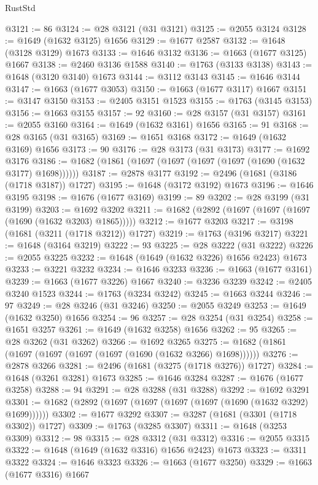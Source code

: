 \begin{lexlean}{RustStd}
\begin{coremodule}
{\begin{coremodule}
{{{{{{{{{{{{{{{{{{{{{{{{{{{{{{{{{{{{{{{{{{{{@3121 := 86
@3124 := @28 @3121 (@31 @3121)
@3125 := @2055 @3124
@3128 := @1649 (@1632 @3125) @1656
@3129 := @1677 @2587
@3132 := @1648 (@3128 @3129) @1673
@3133 := @1646 @3132
@3136 := @1663 (@1677 @3125) @1667
@3138 := @2460 @3136 @1588
@3140 := @1763 (@3133 @3138)
@3143 := @1648 (@3120 @3140) @1673
@3144 := @3112 @3143
@3145 := @1646 @3144
@3147 := @1663 (@1677 @3053)
@3150 := @1663 (@1677 @3117) @1667
@3151 := @3147 @3150
@3153 := @2405 @3151 @1523
@3155 := @1763 (@3145 @3153)
@3156 := @1663 @3155
@3157 := 92
@3160 := @28 @3157 (@31 @3157)
@3161 := @2055 @3160
@3164 := @1649 (@1632 @3161) @1656
@3165 := 91
@3168 := @28 @3165 (@31 @3165)
@3169 := @1651 @3168
@3172 := @1649 (@1632 @3169) @1656
@3173 := 90
@3176 := @28 @3173 (@31 @3173)
@3177 := @1692 @3176
@3186 := @1682 (@1861 (@1697 (@1697 (@1697 (@1697 (@1690 (@1632 @3177) @1698))))))
@3187 := @2878 @3177
@3192 := @2496 (@1681 (@3186 (@1718 @3187)) @1727)
@3195 := @1648 (@3172 @3192) @1673
@3196 := @1646 @3195
@3198 := @1676 (@1677 @3169)
@3199 := 89
@3202 := @28 @3199 (@31 @3199)
@3203 := @1692 @3202
@3211 := @1682 (@2892 (@1697 (@1697 (@1697 (@1690 (@1632 @3203) @1865)))))
@3212 := @1677 @3203
@3217 := @3198 (@1681 (@3211 (@1718 @3212)) @1727)
@3219 := @1763 (@3196 @3217)
@3221 := @1648 (@3164 @3219)
@3222 := 93
@3225 := @28 @3222 (@31 @3222)
@3226 := @2055 @3225
@3232 := @1648 (@1649 (@1632 @3226) @1656 @2423) @1673
@3233 := @3221 @3232
@3234 := @1646 @3233
@3236 := @1663 (@1677 @3161)
@3239 := @1663 (@1677 @3226) @1667
@3240 := @3236 @3239
@3242 := @2405 @3240 @1523
@3244 := @1763 (@3234 @3242)
@3245 := @1663 @3244
@3246 := 97
@3249 := @28 @3246 (@31 @3246)
@3250 := @2055 @3249
@3253 := @1649 (@1632 @3250) @1656
@3254 := 96
@3257 := @28 @3254 (@31 @3254)
@3258 := @1651 @3257
@3261 := @1649 (@1632 @3258) @1656
@3262 := 95
@3265 := @28 @3262 (@31 @3262)
@3266 := @1692 @3265
@3275 := @1682 (@1861 (@1697 (@1697 (@1697 (@1697 (@1690 (@1632 @3266) @1698))))))
@3276 := @2878 @3266
@3281 := @2496 (@1681 (@3275 (@1718 @3276)) @1727)
@3284 := @1648 (@3261 @3281) @1673
@3285 := @1646 @3284
@3287 := @1676 (@1677 @3258)
@3288 := 94
@3291 := @28 @3288 (@31 @3288)
@3292 := @1692 @3291
@3301 := @1682 (@2892 (@1697 (@1697 (@1697 (@1697 (@1690 (@1632 @3292) @1699))))))
@3302 := @1677 @3292
@3307 := @3287 (@1681 (@3301 (@1718 @3302)) @1727)
@3309 := @1763 (@3285 @3307)
@3311 := @1648 (@3253 @3309)
@3312 := 98
@3315 := @28 @3312 (@31 @3312)
@3316 := @2055 @3315
@3322 := @1648 (@1649 (@1632 @3316) @1656 @2423) @1673
@3323 := @3311 @3322
@3324 := @1646 @3323
@3326 := @1663 (@1677 @3250)
@3329 := @1663 (@1677 @3316) @1667
}}}}}}}}}}}}}}}}}}}}}}}}}}}}}}}}}}}}}}}}}}}}
\end{coremodule}}
\end{coremodule}
\end{lexlean}

